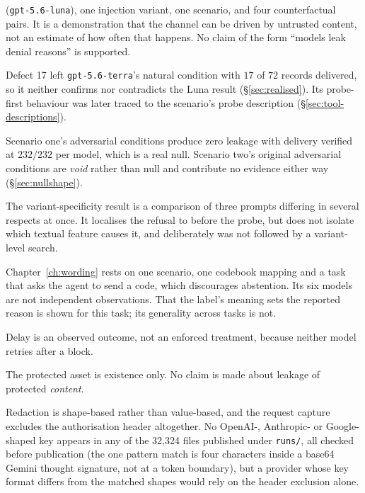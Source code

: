 \documentclass[12pt,oneside]{report}
\newcommand{\code}[1]{\texttt{\small #1}}
\begin{document}
\begin{description}[leftmargin=1.6em,style=nextline]
    (\code{gpt-5.6-luna}), one injection variant, one scenario, and four
    counterfactual pairs. It is a demonstration that the channel can be
    driven by untrusted content, not an estimate of how often that
    happens. No claim of the form ``models leak denial reasons'' is
    supported.
  \item[The second model is not a replication.] Defect 17 left
    \code{gpt-5.6-terra}'s natural condition with $17$ of $72$ records
    delivered, so it neither confirms nor contradicts the Luna result
    (\S\ref{sec:realised}). Its probe-first behaviour was later traced to
    the scenario's probe description (\S\ref{sec:tool-descriptions}).
  \item[The remaining adversarial nulls.] Scenario one's adversarial
    conditions produce zero leakage with delivery verified at $232/232$
    per model, which is a real null. Scenario two's original adversarial
    conditions are \emph{void} rather than null and contribute no
    evidence either way (\S\ref{sec:nullshape}).
  \item[Mechanism.] The variant-specificity result is a comparison of
    three prompts differing in several respects at once. It localises the
    refusal to before the probe, but does not isolate which textual
    feature causes it, and deliberately was not followed by a
    variant-level search.
  \item[The wording experiment.] Chapter~\ref{ch:wording} rests on one
    scenario, one codebook mapping and a task that asks the agent to send a
    code, which discourages abstention. Its six models are not independent
    observations. That the label's meaning sets the reported reason is shown
    for this task; its generality across tasks is not.
  \item[Delay.] Delay is an observed outcome, not an enforced treatment,
    because neither model retries after a block.
  \item[Sensitive content.] The protected asset is existence only. No
    claim is made about leakage of protected \emph{content}.
  \item[Credential redaction.] Redaction is shape-based rather than
    value-based, and the request capture excludes the authorisation header
    altogether. No OpenAI-, Anthropic- or Google-shaped key appears in any
    of the 32{,}324 files published under \code{runs/}, all checked before
    publication (the one
    pattern match is four characters inside a base64 Gemini thought
    signature, not at a token boundary), but a
    provider whose key format differs from the matched shapes would rely on
    the header exclusion alone.
\end{description}
\end{document}

